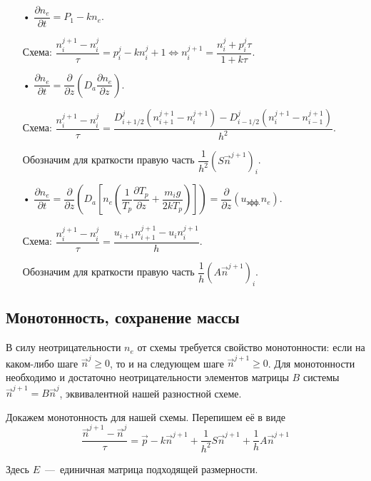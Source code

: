 \documentclass[14pt, a4paper, fleqn, twoside]{extreport}
\theoremstyle{definiton}
\theoremstyle{definition}
\let\geq\geqslant
\begin{document}
\begin{itemize}

\item[•] $\dfrac{\partial n_e}{\partial t}=P_1-kn_e.$

Схема: $\dfrac{n_i^{j+1}-n_i^j}{\tau}=p_i^j-kn_i^j+1\Leftrightarrow n_i^{j+1} = \dfrac{n_i^j+p_i^j\tau}{1+k\tau}.$

\bigskip

\item[•] $\dfrac{\partial n_e}{\partial t}=\dfrac{\partial}{\partial z}\left(D_a\dfrac{\partial n_e}{\partial z}\right).$

Схема: $\dfrac{n_i^{j+1}-n_i^j}{\tau} = \dfrac{D_{i+1/2}^j(n_{i+1}^{j+1}-n_i^{j+1})-D_{i-1/2}^j(n_{i}^{j+1}-n_{i-1}^{j+1})}{h^2}$. 

Обозначим для краткости правую часть $\dfrac{1}{h^2}(S\vec{n}^{j+1})_i$.

\bigskip

\item[•] $\dfrac{\partial n_e}{\partial t}=\dfrac{\partial}{\partial z}\left(D_a\left[n_e\left(\dfrac{1}{T_p}\dfrac{\partial T_p}{\partial z}+\dfrac{m_ig}{2kT_p}\right)\right]\right)=\dfrac{\partial}{\partial z}(u_\textrm{эфф.}n_e)$.

Схема: $\dfrac{n_i^{j+1}-n_i^j}{\tau} = \dfrac{u_{i+1}n_{i+1}^{j+1}-u_i n_i^{j+1}}{h}$.

Обозначим для краткости правую часть $\dfrac{1}{h}(A\vec{n}^{j+1})_i$.

\end{itemize}

\subsection*{Монотонность, сохранение массы}

В силу неотрицательности $n_e$ от схемы требуется свойство монотонности: если на каком-либо шаге $\vec{n}^j \geq 0$, то и на следующем шаге $\vec{n}^{j+1}\geq 0$. Для монотонности необходимо и достаточно неотрицательности элементов матрицы $B$ системы $\vec{n}^{j+1}=B\vec{n}^j$, эквивалентной нашей разностной схеме.

\smallskip

Докажем монотонность для нашей схемы. Перепишем её в виде $$\dfrac{\vec{n}^{j+1}-\vec{n}^j}{\tau}= \vec{p} - k\vec{n}^{j+1}+\dfrac{1}{h^2}S\vec{n}^{j+1}+\dfrac{1}{h}A\vec{n}^{j+1}$$

Здесь $E$~---~единичная матрица подходящей размерности.
\end{document}
